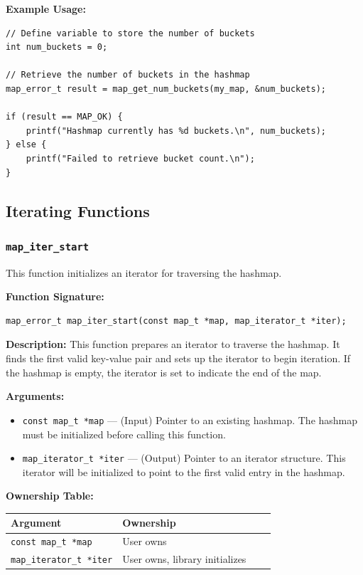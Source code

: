 \documentclass[titlepage]{article}
\begin{document}
\textbf{Example Usage:}
\begin{verbatim}
// Define variable to store the number of buckets
int num_buckets = 0;

// Retrieve the number of buckets in the hashmap
map_error_t result = map_get_num_buckets(my_map, &num_buckets);

if (result == MAP_OK) {
    printf("Hashmap currently has %d buckets.\n", num_buckets);
} else {
    printf("Failed to retrieve bucket count.\n");
}
\end{verbatim}

\subsection{Iterating Functions}
\subsubsection{\texttt{map\_iter\_start}}
This function initializes an iterator for traversing the hashmap.

\textbf{Function Signature:}
\begin{verbatim}
map_error_t map_iter_start(const map_t *map, map_iterator_t *iter);
\end{verbatim}

\textbf{Description:}
This function prepares an iterator to traverse the hashmap.
It finds the first valid key-value pair and sets up the iterator to begin iteration.
If the hashmap is empty, the iterator is set to indicate the end of the map.

\textbf{Arguments:}
\begin{itemize}
    \item \texttt{const map\_t *map} --- (Input) Pointer to an existing hashmap.
    The hashmap must be initialized before calling this function.

    \item \texttt{map\_iterator\_t *iter} --- (Output) Pointer to an iterator structure.
    This iterator will be initialized to point to the first valid entry in the hashmap.
\end{itemize}

\textbf{Ownership Table:}
\begin{center}
\begin{tabular}{@{} l l c c @{} }
\toprule
\textbf{Argument} & \textbf{Ownership}  \\
\midrule
\texttt{const map\_t *map} & User owns  \\
\texttt{map\_iterator\_t *iter} & User owns, library initializes \\
\bottomrule
\end{tabular}
\end{center}
\end{document}
